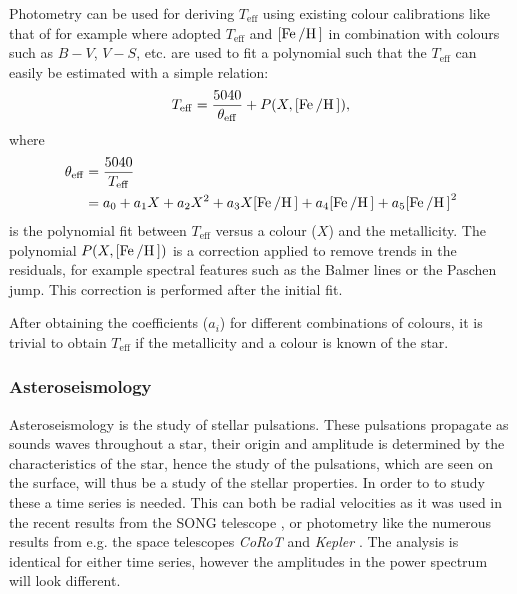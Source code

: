 Photometry can be used for deriving $T_\mathrm{eff}$ using existing colour
calibrations like that of for example \citet{Ramirez2005a} where adopted
$T_\mathrm{eff}$ and $[\ion{Fe}/\ion{H}]$ in combination with colours such as
$B-V$, $V-S$, etc. are used to fit a polynomial such that the $T_\mathrm{eff}$
can easily be estimated with a simple relation:
\begin{align}
  T_\mathrm{eff} = \frac{5040}{\theta_\mathrm{eff}} + P(X, [\ion{Fe}/\ion{H}]),
\end{align}
where
\begin{align}
  \theta_\mathrm{eff} &= \frac{5040}{T_\mathrm{eff}} \\
                      &= a_0+a_1 X+a_2 X^2+a_3X[\ion{Fe}/\ion{H}] + a_4[\ion{Fe}/\ion{H}] + a_5[\ion{Fe}/\ion{H}]^2
\end{align}
is the polynomial fit between $T_\mathrm{eff}$ versus a colour ($X$) and the
metallicity. The polynomial $P(X, [\ion{Fe}/\ion{H}])$ is a correction applied
to remove trends in the residuals, for example spectral features such as the
Balmer lines or the Paschen jump. This correction is performed after the initial
fit.

After obtaining the coefficients ($a_i$) for different combinations of colours,
it is trivial to obtain $T_\mathrm{eff}$ if the metallicity and a colour is
known of the star.

\subsubsection{Asteroseismology}

Asteroseismology is the study of stellar pulsations. These pulsations propagate
as sounds waves throughout a star, their origin and amplitude is determined by
the characteristics of the star, hence the study of the pulsations, which are
seen on the surface, will thus be a study of the stellar properties. In order to
to study these a time series is needed. This can both be radial velocities as it
was used in the recent results from the SONG telescope \citep{Grundahl2017}, or
photometry like the numerous results from e.g. the space telescopes \emph{CoRoT}
and \emph{Kepler}
\citep[see e.g.][]{Christensen-Dalsgaard2010,Huber2014,Chaplin2011}. The
analysis is identical for either time series, however the amplitudes in the
power spectrum will look different.


